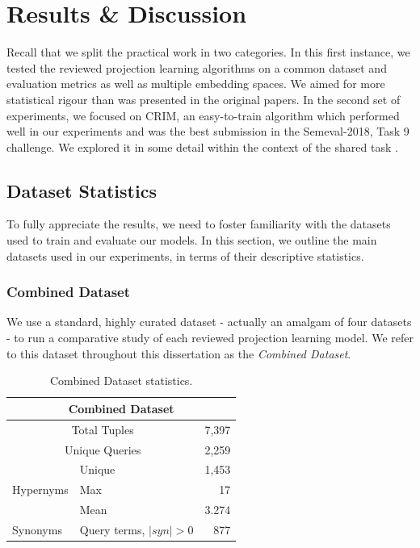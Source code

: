 \chapter{Results \& Discussion}
Recall that we split the practical work in two categories.  In this first instance, we tested the reviewed projection learning algorithms on a common dataset and evaluation metrics as well as multiple embedding spaces.  We aimed for more statistical rigour than was presented in the original papers.  In the second set of experiments, we focused on CRIM, an easy-to-train algorithm which performed well in our experiments and was the best submission in the Semeval-2018, Task 9 challenge.  We explored it in some detail within the context of the shared task \citep{camacho2018semeval}.  

\section{Dataset Statistics}
To fully appreciate the results, we need to foster familiarity with the datasets used to train and evaluate our models.  In this section, we outline the main datasets used in our experiments, in terms of their descriptive statistics.  

\subsection{Combined Dataset}
We use a standard, highly curated dataset - actually an amalgam of four datasets - to run a comparative study of each reviewed projection learning model.   We refer to this dataset throughout this dissertation as the \textit{Combined Dataset}.  
\begin{table}\centering
\begin{tabular}{@{}llr@{}}\toprule
\multicolumn{3}{c}{\textbf{Combined Dataset}} \\ \midrule
\multicolumn{2}{c}{Total Tuples} & 7,397\\
\multicolumn{2}{c}{Unique Queries} & 2,259\\ \midrule
\multirow{3}{*}{Hypernyms} & Unique & 1,453\\
& Max & 17\\
& Mean & 3.274\\
Synonyms & Query terms, $\vert syn \vert > 0$ & 877\\
\bottomrule
\end{tabular}
\caption{Combined Dataset statistics.}\label{tab:combined_dataset_stat}
\end{table}

